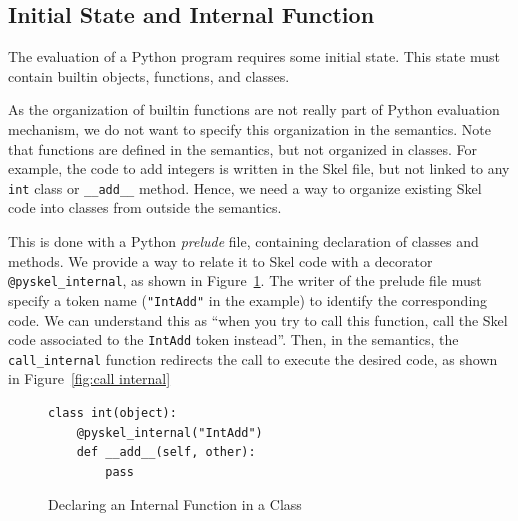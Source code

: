 \documentclass[submission,copyright,creativecommons]{eptcs}
\begin{document}
\subsection{Initial State and Internal Function}\label{sec:internal function}
The evaluation of a Python program requires some initial state.
This state must contain builtin objects, functions, and classes.

As the organization of builtin functions are not really part of Python
evaluation mechanism, we do not want to specify this organization in the semantics.
Note that functions are defined in the semantics, but not organized in classes.
For example, the code to add integers is written in the Skel file, but not linked to any \texttt{int} class or \texttt{__add__} method.
Hence, we need a way to organize existing Skel code into classes from outside the semantics.

This is done with a Python \emph{prelude} file, containing declaration of classes and methods.
We provide a way to relate it to Skel code with a decorator
\texttt{@pyskel_internal}, as shown in Figure~\ref{fig:internal class declaration}.
The writer of the prelude file must specify a token name (\texttt{"IntAdd"} in the example) to identify the corresponding code.
We can understand this as ``when you try to call this function, call the Skel code associated to the \texttt{IntAdd} token instead''.
Then, in the semantics, the \texttt{call_internal} function redirects the call to execute the desired code, as shown in Figure~\ref{fig:call internal}

\begin{figure}[ht]
  \centering
  \begin{minipage}{0.3\linewidth}
    \begin{verbatim}
class int(object):
    @pyskel_internal("IntAdd")
    def __add__(self, other):
        pass
    \end{verbatim}
  \end{minipage}
  \caption{\label{fig:internal class declaration}Declaring an Internal Function in a Class}
\end{figure}
\end{document}
